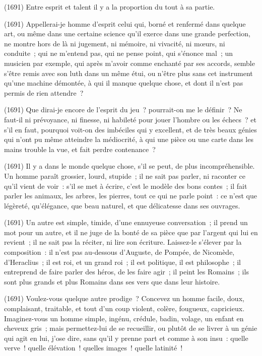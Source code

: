 \documentclass[french,twoside]{book} %
\newcommand{\ed}[1]{ {\color{silver}\sffamily\footnotesize (#1)} } %
\begin{document}
\ed{1691}Entre esprit et talent il y a la proportion du tout à sa partie.\par
\ed{1691}Appellerai-je homme d’esprit celui qui, borné et renfermé dans quelque art, ou même dans une certaine science qu’il exerce dans une grande perfection, ne montre hors de là ni jugement, ni mémoire, ni vivacité, ni mœurs, ni conduite ; qui ne m’entend pas, qui ne pense point, qui s’énonce mal ; un musicien par exemple, qui après m’avoir comme enchanté par ses accords, semble s’être remis avec son luth dans un même étui, ou n’être plus sans cet instrument qu’une machine démontée, à qui il manque quelque chose, et dont il n’est pas permis de rien attendre ?\par
\ed{1691}Que dirai-je encore de l’esprit du jeu ? pourrait-on me le définir ? Ne faut-il ni prévoyance, ni finesse, ni habileté pour jouer l’hombre ou les échecs ? et s’il en faut, pourquoi voit-on des imbéciles qui y excellent, et de très beaux génies qui n’ont pu même atteindre la médiocrité, à qui une pièce ou une carte dans les mains trouble la vue, et fait perdre contenance ?\par
\ed{1691}Il y a dans le monde quelque chose, s’il se peut, de plus incompréhensible. Un homme paraît grossier, lourd, stupide ; il ne sait pas parler, ni raconter ce qu’il vient de voir : s’il se met à écrire, c’est le modèle des bons contes ; il fait parler les animaux, les arbres, les pierres, tout ce qui ne parle point : ce n’est que légèreté, qu’élégance, que beau naturel, et que délicatesse dans ses ouvrages.\par
\ed{1691}Un autre est simple, timide, d’une ennuyeuse conversation ; il prend un mot pour un autre, et il ne juge de la bonté de sa pièce que par l’argent qui lui en revient ; il ne sait pas la réciter, ni lire son écriture. Laissez-le s’élever par la composition : il n’est pas au-dessous d’Auguste, de Pompée, de Nicomède, d’Heraclius ; il est roi, et un grand roi ; il est politique, il est philosophe ; il entreprend de faire parler des héros, de les faire agir ; il peint les Romains ; ils sont plus grands et plus Romains dans ses vers que dans leur histoire.\par
\ed{1691}Voulez-vous quelque autre prodige ? Concevez un homme facile, doux, complaisant, traitable, et tout d’un coup violent, colère, fougueux, capricieux. Imaginez-vous un homme simple, ingénu, crédule, badin, volage, un enfant en cheveux gris ; mais permettez-lui de se recueillir, ou plutôt de se livrer à un génie qui agit en lui, j’ose dire, sans qu’il y prenne part et comme à son insu : quelle verve ! quelle élévation ! quelles images ! quelle latinité !\par
\end{document}
